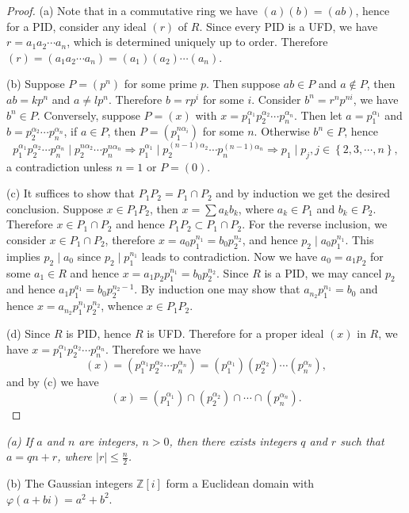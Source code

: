 \begin{proof}
(a) Note that in a commutative ring we have $(a)(b)=(ab)$, hence for a PID, consider any ideal $(r)$ of $R$. Since every PID is a UFD, we have $r=a_1a_2\cdots a_n$, which is determined uniquely up to order. Therefore $(r)=(a_1a_2\cdots a_n)=(a_1)(a_2)\cdots(a_n)$.\par
(b) Suppose $P=(p^n)$ for some prime $p$. Then suppose $ab\in P$ and $a\notin P$, then $ab=kp^n$ and $a\ne lp^n$. Therefore $b=rp^i$ for some $i$. Consider $b^n=r^np^{ni}$, we have $b^n\in P$. Conversely, suppose $P=(x)$ with $x=p_{1}^{\alpha _1}p_{2}^{\alpha _2}\cdots p_{n}^{\alpha _n}$. Then let $a=p_1^{\alpha_1}$ and $b=p_2^{\alpha_2}\cdots p_n^{\alpha_n}$, if $a\in P$, then $P=(p_1^{n\alpha_i})$ for some $n$. Otherwise $b^n\in P$, hence 
$$
p_{1}^{\alpha _1}p_{2}^{\alpha _2}\cdots p_{n}^{\alpha _n}\mid p_{2}^{n\alpha _2}\cdots p_{n}^{n\alpha _n}\Rightarrow p_{1}^{\alpha _1}\mid p_{2}^{\left( n-1 \right) \alpha _2}\cdots p_{n}^{\left( n-1 \right) \alpha _n}\Rightarrow p_1\mid p_j,j\in \left\{ 2,3,\cdots ,n \right\} ,
$$
a contradiction unless $n=1$ or $P=(0)$.\par
(c) It suffices to show that $P_1P_2=P_1\cap P_2$ and by induction we get the desired conclusion. Suppose $x\in P_1P_2$, then $x=\sum a_kb_k$, where $a_k\in P_1$ and $b_k\in P_2$. Therefore $x\in P_1\cap P_2$ and hence $P_1P_2\subset P_1\cap P_2$. For the reverse inclusion, we consider $x\in P_1\cap P_2$, therefore $x=a_0p_1^{n_1}=b_0p_2^{n_2}$, and hence $p_2\mid a_0p_1^{n_1}$. This implies $p_2\mid a_0$ since $p_2\mid p_1^{n_1}$ leads to contradiction. Now we have $a_0=a_1p_2$ for some $a_1\in R$ and hence $x=a_1p_2p_1^{n_1}=b_0p_2^{n_2}$. Since $R$ is a PID, we may cancel $p_2$ and hence $a_1p_1^{a_1}=b_0p_2^{n_2-1}$. By induction one may show that $a_{n_2}p_1^{n_1}=b_0$ and hence $x=a_{n_2}p_1^{n_1}p_2^{n_2}$, whence $x\in P_1P_2$.\par
(d) Since $R$ is PID, hence $R$ is UFD. Therefore for a proper ideal $(x)$ in $R$, we have $x=p_{1}^{\alpha _1}p_{2}^{\alpha _2}\cdots p_{n}^{\alpha _n}$. Therefore we have 
$$
\left( x \right) =\left( p_{1}^{\alpha _1}p_{2}^{\alpha _2}\cdots p_{n}^{\alpha _n} \right) =\left( p_{1}^{\alpha _1} \right) \left( p_{2}^{\alpha _2} \right) \cdots \left( p_{n}^{\alpha _n} \right) ,
$$
and by (c) we have 
$$
\left( x \right) =\left( p_{1}^{\alpha _1} \right) \cap \left( p_{2}^{\alpha _2} \right) \cap \cdots \cap \left( p_{n}^{\alpha _n} \right) .
$$
\end{proof}
\begin{problem}\em
(a) If $a$ and $n$ are integers, $n>0$, then there exists integers $q$ and $r$ such that $a=qn+r$, where $|r|\le\frac{n}{2}$.\par
(b) The Gaussian integers $\mathbb{Z}[i]$ form a Euclidean domain with $\varphi(a+bi)=a^2+b^2$.
\end{problem}

